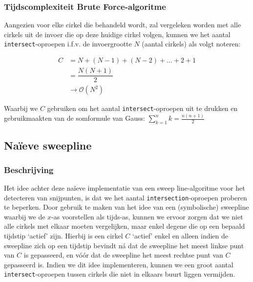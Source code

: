 \documentclass[12pt]{article}
\begin{document}
\subsubsection{Tijdscomplexiteit Brute Force-algoritme}\label{sec:brute-force}
Aangezien voor elke cirkel die behandeld wordt, zal vergeleken worden met alle cirkels uit de invoer die op deze huidige cirkel volgen, kunnen we het aantal \texttt{intersect}-oproepen i.f.v. de invoergrootte $N$ (aantal cirkels) als volgt noteren:

\begin{align*}
C &= N + (N-1) + (N-2) + \ldots + 2 + 1\\
&= \dfrac{N(N+1)}{2}\\
&\rightarrow \mathcal{O}(N^2)
\end{align*}


Waarbij we $ C $ gebruiken om het aantal \texttt{intersect}-oproepen uit te drukken en gebruikmaakten van de somformule van Gauss: $ \sum_{k=1}^{n} k = \frac{n(n+1)}{2}$ 

\subsection{Naïeve sweepline}
\subsubsection{Beschrijving}

Het idee achter deze naïeve implementatie van een sweep line-algoritme voor het detecteren van snijpunten, is dat we het aantal \texttt{intersection}-oproepen proberen te beperken. Door gebruik te maken van het idee van een (symbolische) sweepline waarbij we de $ x $-as voorstellen als tijds-as, kunnen we ervoor zorgen dat we niet alle cirkels met elkaar moeten vergelijken, maar enkel degene die op een bepaald tijdstip `actief' zijn. Hierbij is een cirkel $ C $ `actief' enkel en alleen indien de sweepline zich op een tijdstip bevindt ná dat de sweepline het meest linkse punt van $ C $ is gepasseerd, en vóór dat de sweepline het meest rechtse punt van $ C $ gepasseerd is. Indien we dit idee implementeren, kunnen we een groot aantal \texttt{intersect}-oproepen tussen cirkels die niet in elkaars buurt liggen vermijden. 
\end{document}
